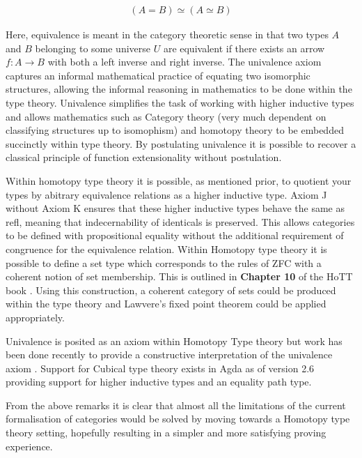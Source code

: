 \begin{align*}
    (A = B) \simeq (A \simeq B)
\end{align*}

Here, equivalence is meant in the category theoretic sense in that
two types $A$ and $B$ belonging to some universe $U$ are equivalent if there
exists an arrow $f : A \rightarrow B$ with both a left inverse and right
inverse. The univalence axiom captures an informal mathematical practice of
equating two isomorphic structures, allowing the informal reasoning in
mathematics to be done within the type theory. Univalence simplifies the task of
working with higher inductive types and allows mathematics such as Category
theory (very much dependent on classifying structures up to isomophism) and
homotopy theory to be embedded succinctly within type theory. By postulating
univalence it is possible to recover a classical principle of function
extensionality without postulation.

Within homotopy type theory it is possible, as mentioned prior, to quotient your
types by abitrary equivalence relations as a higher inductive type.
\textsf{Axiom J} without \textsf{Axiom K} ensures that these higher inductive
types behave the same as \textsf{refl}, meaning that indecernability of identicals
is preserved. This allows categories to be defined with propositional equality
without the additional requirement of congruence for the equivalence relation.
Within Homotopy type theory it is possible to define a set type which
corresponds to the rules of ZFC with a coherent notion of set membership. This
is outlined in \textbf{Chapter 10} of the HoTT book \cite{hottbook} . Using this construction, a coherent category of sets
could be produced within the type theory and Lawvere's fixed point theorem could
be applied appropriately.

Univalence is posited as an axiom within Homotopy Type theory but work has been
done recently to provide a constructive interpretation of the univalence axiom
.  Support for Cubical type theory exists in Agda as of version
2.6 providing support for higher inductive types and an equality path type.

From the above remarks it is clear that almost all the limitations of the
current formalisation of categories would be solved by moving towards a Homotopy
type theory setting, hopefully resulting in a simpler and more satisfying
proving experience.
